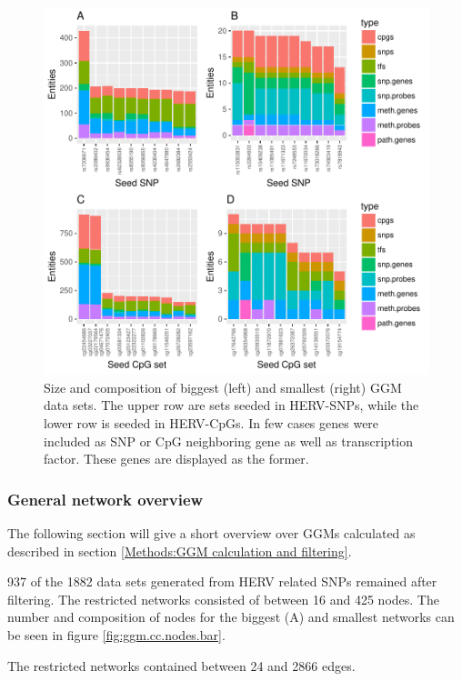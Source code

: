 \documentclass[a4paper,12pt,twoside,openright]{article}
\begin{document}
\begin{figure}[tb]
	\includegraphics[scale = 1, keepaspectratio = true]{../figures/hervS2_ggm_data_entity_bar}  
	\caption{Size and composition of biggest (left) and smallest (right) GGM data sets. The upper row are sets seeded in HERV-SNPs, while the lower row is seeded in HERV-CpGs. In few cases genes were included as SNP or CpG neighboring gene as well as transcription factor. These genes are displayed as the former.}
    \label{fig:ggm.data.entity.bar}
\end{figure}


\subsubsection{General network overview}
\label{Results:General network overview}
The following section will give a short overview over GGMs calculated as described in section \ref{Methods:GGM calculation and filtering}. 

937 of the 1882 data sets generated from HERV related SNPs remained after filtering. The restricted networks consisted of between 16 and 425 nodes. The number and composition of nodes for the biggest (A) and smallest networks can be seen in figure \ref{fig:ggm.cc.nodes.bar}.

The restricted networks contained between 24 and 2866 edges. 
\end{document}
